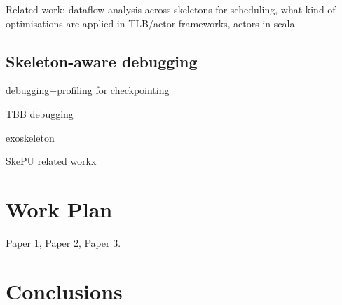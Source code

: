 Related work: dataflow analysis across skeletons for scheduling, what
kind of optimisations are applied in TLB/actor frameworks, actors in
scala


\subsection{Skeleton-aware debugging}
debugging+profiling for checkpointing

TBB debugging

exoskeleton

SkePU related workx


\section{Work Plan}

Paper 1, Paper 2, Paper 3.


\section{Conclusions}


\newpage
\label{bibliography}
\printbibliography



